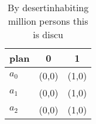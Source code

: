 \documentclass[a4paper]{article}
\begin{document}
\begin{table}
\begin{adjustbox}{width=0.9\columnwidth}
\begin{tabular}{|l|l|l|}
\hline
\textbf{plan} & \multicolumn{1}{c|}{\textbf{0}} & \multicolumn{1}{c|}{\textbf{1}} \\ \hline
\textbf{$a_0$}  & (0,0) & (1,0) \\ \hline
\textbf{$a_1$}  & (0,0) & (1,0) \\ \hline
\textbf{$a_2$}  & (0,0) & (1,0) \\ \hline
\end{tabular}
\end{adjustbox}
\caption{By desertinhabiting million persons this is discu
}
\end{table}
\end{document}
